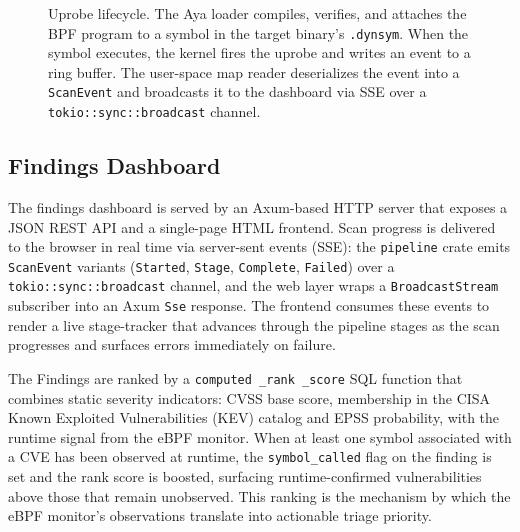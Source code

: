 \documentclass[conference]{IEEEtran}
\begin{document}
\begin{figure}[t]
  \caption{Uprobe lifecycle. The Aya loader compiles, verifies,
    and attaches the BPF program to a symbol in the target
    binary's \texttt{.dynsym}. When the symbol executes, the
    kernel fires the uprobe and writes an event to a ring buffer.
    The user-space map reader deserializes the event into a
    \texttt{ScanEvent} and broadcasts it to the dashboard via
    SSE over a \texttt{tokio::sync::broadcast} channel.}
  \label{fig:uprobe-lifecycle}
\end{figure}

\subsection{Findings Dashboard}

The findings dashboard is served by an Axum-based HTTP server that exposes a JSON REST API and a single-page HTML frontend.
Scan progress is delivered to the browser in real time via server-sent events (SSE): the \texttt{pipeline} crate emits \texttt{ScanEvent} variants (\texttt{Started}, \texttt{Stage}, \texttt{Complete}, \texttt{Failed}) over a \texttt{tokio::sync::broadcast} channel, and the web layer wraps a \texttt{BroadcastStream} subscriber into an Axum \texttt{Sse} response.
The frontend consumes these events to render a live stage-tracker that advances through the pipeline stages as the scan progresses and surfaces errors immediately on failure.

The Findings are ranked by a \texttt{computed \_rank \_score} SQL function that combines static severity indicators: CVSS base score, membership in the CISA Known Exploited Vulnerabilities (KEV) catalog and EPSS probability, with the runtime signal from the eBPF monitor.
When at least one symbol associated with a CVE has been observed at runtime, the \texttt{symbol\_called} flag on the finding is set and the rank score is boosted, surfacing runtime-confirmed vulnerabilities above those that remain unobserved.
This ranking is the mechanism by which the eBPF monitor's observations translate into actionable triage priority.
\end{document}
